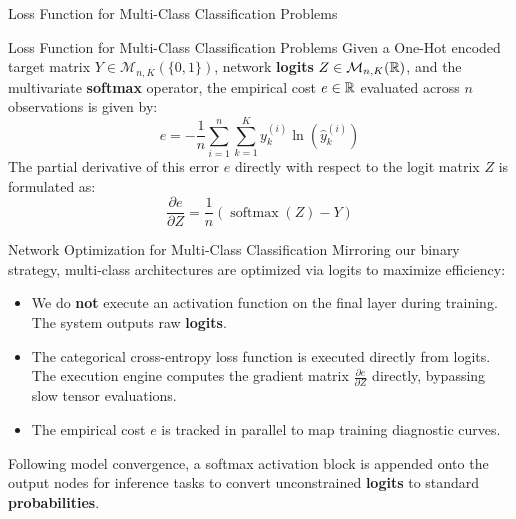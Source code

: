 \begin{frame}{Loss Function for Multi-Class Classification Problems}
	\begin{block}{Loss Function for Multi-Class Classification Problems}
		Given a One-Hot encoded target matrix $Y \in \mathcal{M}_{n,K}(\{0, 1\})$, network \textbf{logits} $Z \in \mathcal{M}_{n,K}(\mathbb{R})$, and the multivariate \textbf{softmax} operator, the empirical cost $e \in \mathbb{R}$ evaluated across $n$ observations is given by:
		\begin{equation*}
			e = - \frac{1}{n} \sum_{i=1}^n \sum_{k=1}^K y_k^{(i)} \ln{\left(\hat{y}_k^{(i)}\right)}
		\end{equation*}
		The partial derivative of this error $e$ directly with respect to the logit matrix $Z$ is formulated as:
		\begin{equation*}
			\frac{\partial{e}}{\partial{Z}} = \frac{1}{n} \left(\operatorname{softmax}\left(Z\right) - Y\right)
		\end{equation*}
	\end{block}
\end{frame}

\begin{frame}{Network Optimization for Multi-Class Classification}
	Mirroring our binary strategy, multi-class architectures are optimized via logits to maximize efficiency:
	\begin{itemize}
		\item We do \textbf{not} execute an activation function on the final layer during training. The system outputs raw \textbf{logits}.
		\pause
		\item The categorical cross-entropy loss function is executed directly from logits. The execution engine computes the gradient matrix $\frac{\partial{e}}{\partial{Z}}$ directly, bypassing slow tensor evaluations.
		\pause
		\item The empirical cost $e$ is tracked in parallel to map training diagnostic curves.
	\end{itemize}
	
	\pause
	\vspace{0.3cm}
	
	Following model convergence, a softmax activation block is appended onto the output nodes for inference tasks to convert unconstrained \textbf{logits} to standard \textbf{probabilities}.
\end{frame}


